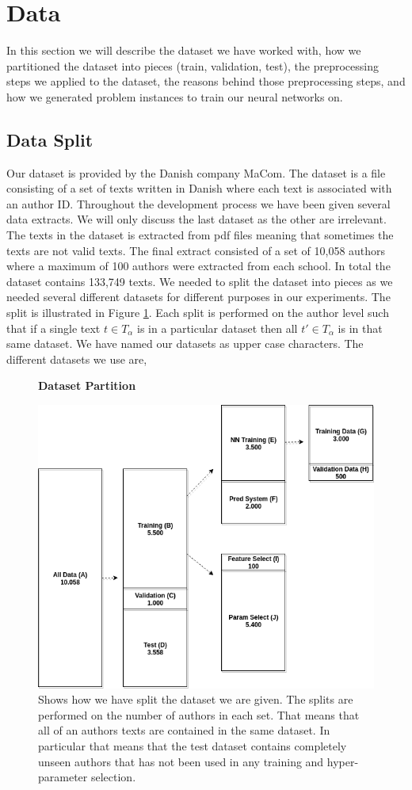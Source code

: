 \section{Data} \label{sec:data}

In this section we will describe the dataset we have worked with, how we
partitioned the dataset into pieces (train, validation, test), the preprocessing
steps we applied to the dataset, the reasons behind those preprocessing steps,
and how we generated problem instances to train our neural networks on.


\subsection{Data Split}

Our dataset is provided by the Danish company MaCom. The dataset is a file
consisting of a set of texts written in Danish where each text is associated
with an author ID. Throughout the development process we have been given
several data extracts. We will only discuss the last dataset as the other are
irrelevant. The texts in the dataset is extracted from pdf files meaning that
sometimes the texts are not valid texts. The final extract consisted of a set of
10,058 authors where a maximum of 100 authors were extracted from each school.
In total the dataset contains 133,749 texts. We needed to split the dataset into
pieces as we needed several different datasets for different purposes in our
experiments. The split is illustrated in Figure \ref{fig:data_split}. Each split
is performed on the author level such that if a single text $t \in T_\alpha$ is
in a particular dataset then all $t' \in T_\alpha$ is in that same dataset. We
have named our datasets as upper case characters. The different datasets we use
are,

\begin{figure}
    \centering
    \textbf{Dataset Partition}\par\medskip
    \includegraphics[width=.6\textwidth]{./pictures/data/data_split.png}
    \caption{Shows how we have split the dataset we are given. The splits are
        performed on the number of authors in each set. That means that all of
        an authors texts are contained in the same dataset. In particular that
        means that the test dataset contains completely unseen authors that has
        not been used in any training and hyper-parameter selection.}
    \label{fig:data_split}
\end{figure}

